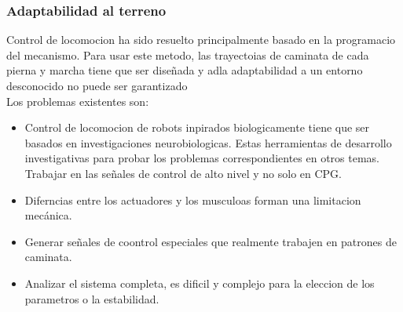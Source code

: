 \documentclass[10pt,onecolumn,twoside,letterpaper]{article}
\begin{document}
\subsubsection{Adaptabilidad al terreno}
Control de locomocion ha sido resuelto principalmente basado en la programacio del mecanismo. Para usar este metodo, las trayectoias de caminata de cada pierna y marcha tiene que ser dise\~nada y adla adaptabilidad a un entorno desconocido no puede ser garantizado\cite{Wu2009}\\
Los problemas existentes son:\cite{Wu2009}
\begin{itemize}
\item Control de locomocion de robots inpirados biologicamente tiene que ser basados en investigaciones neurobiologicas. Estas herramientas de desarrollo investigativas para probar los problemas correspondientes en otros temas. Trabajar en las se\~nales de control de alto nivel y no solo en CPG.
\item Diferncias entre los actuadores y los musculoas forman una limitacion mec\'anica.
\item Generar se\~nales de coontrol especiales que realmente trabajen en patrones de caminata.
\item Analizar el sistema completa, es dificil y complejo para la eleccion de los parametros o la estabilidad.
\end{itemize}
\href{run:/home/jackmaster/Downloads/[2009 Wu QiDi and Liu ChengJu and Zhang JiaQi and Chen QiJun] Art Survey of locomotion control of legged robots inspired biological concept.pdf}{
}\cite{Wu2009}
\end{document}
